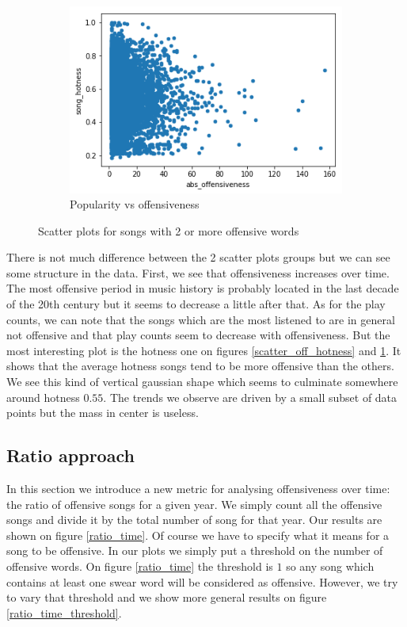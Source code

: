 \documentclass[11pt]{article}
\begin{document}
\begin{figure}
\begin{subfigure}[b]{0.45\textwidth}
\includegraphics[width=\textwidth]{plots/scatter_off_hotness_2}
\caption{Popularity vs offensiveness}
\label{scatter_off_hotness_2}
\end{subfigure}
\caption{Scatter plots for songs with 2 or more offensive words}
\label{scatter_plots_2}
\end{figure}

There is not much difference between the 2 scatter plots groups but we can see some structure in the data. First, we see that offensiveness increases over time. The most offensive period in music history is probably located in the last decade of the 20th century but it seems to decrease a little after that. As for the play counts, we can note that the songs which are the most listened to are in general not offensive and that play counts seem to decrease with offensiveness. But the most interesting plot is the hotness one on figures \ref{scatter_off_hotness} and \ref{scatter_off_hotness_2}. It shows that the average hotness songs tend to be more offensive than the others. We see this kind of vertical gaussian shape which seems to culminate somewhere around hotness $0.55$. The trends we observe are driven by a small subset of data points but the mass in center is useless. 


\subsection{Ratio approach}
In this section we introduce a new metric for analysing offensiveness over time: the ratio of offensive songs for a given year. We simply count all the offensive songs and divide it by the total number of song for that year. Our results are shown on figure \ref{ratio_time}. Of course we have to specify what it means for a song to be offensive. In our plots we simply put a threshold on the number of offensive words. On figure \ref{ratio_time} the threshold is $1$ so any song which contains at least one swear word will be considered as offensive. However, we try to vary that threshold and we show more general results on figure \ref{ratio_time_threshold}.
\end{document}
